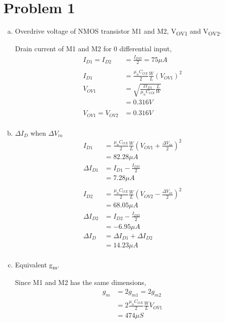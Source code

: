 \documentclass{article}
\begin{document}
\section{Problem 1}
\label{sec:org072a76a}
\begin{enumerate}[(a)]
\item Overdrive voltage of NMOS transistor M1 and M2, V\textsubscript{OV1} and V\textsubscript{OV2}.

Drain current of M1 and M2 for 0 differential input,
\begin{equation*}
\begin{aligned}
I_{D1} = I_{D2} &= \frac{I_{DD}}{2} = 75 \mu{}A \\
\\
I_{D1} &= \frac{\mu_{n}C_{OX}}{2}\frac{W}{L}(V_{OV1})^{2} \\
V_{OV1} &= \sqrt{\frac{2I_{D1}}{\mu_{n}C_{OX}}\frac{L}{W}} \\
&= 0.316 V \\
\\
V_{OV1} = V_{OV2} &= 0.316V \\
\end{aligned}
\end{equation*}

\item \(\Delta{}I_{D}\) when \(\Delta{}V_{in}\)
\begin{equation*}
\begin{aligned}
I_{D1} &= \frac{\mu_{n}C_{OX}}{2}\frac{W}{L}(V_{OV1} + \frac{\Delta{}V_{in}}{2})^{2} \\
&= 82.28 \mu{}A \\
\Delta{}I_{D1} &= I_{D1} - \frac{I_{DD}}{2} \\
&= 7.28 \mu{}A \\
\\
I_{D2} &= \frac{\mu_{n}C_{OX}}{2}\frac{W}{L}(V_{OV2} - \frac{\Delta{}V_{in}}{2})^{2} \\
&= 68.05 \mu{}A \\
\Delta{}I_{D2} &= I_{D2} - \frac{I_{DD}}{2} \\
&= -6.95 \mu{}A \\
\Delta{}I_{D} &= \Delta{}I_{D1} + \Delta{}I_{D2} \\
&= 14.23 \mu{}A \\
\end{aligned}
\end{equation*}

\item Equivalent g\textsubscript{m}.

Since M1 and M2 has the same dimensions,
\begin{equation*}
\begin{aligned}
g_{m} &= 2g_{m1} = 2g_{m2} \\
&= 2\frac{\mu_{n}C_{OX}}{2}\frac{W}{L}V_{OV1} \\
&= 474 \mu{}S \\
\end{aligned}
\end{equation*}
\end{enumerate}
\end{document}
